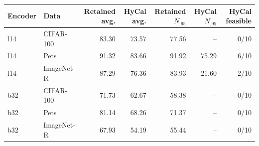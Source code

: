 \begin{tabular}{@{}llrrrrr@{}}
\toprule
Encoder & Data & Retained avg. & HyCal avg. & Retained $N_{.95}$ & HyCal $N_{.95}$ & HyCal feasible \\
\midrule
l14 & CIFAR-100 & 83.30 & 73.57 & 77.56 & -- & 0/10 \\
l14 & Pets & 91.32 & 83.66 & 91.92 & 75.29 & 6/10 \\
l14 & ImageNet-R & 87.29 & 76.36 & 83.93 & 21.60 & 2/10 \\
b32 & CIFAR-100 & 71.73 & 62.67 & 58.38 & -- & 0/10 \\
b32 & Pets & 81.14 & 68.26 & 71.37 & -- & 0/10 \\
b32 & ImageNet-R & 67.93 & 54.19 & 55.44 & -- & 0/10 \\
\bottomrule
\end{tabular}
